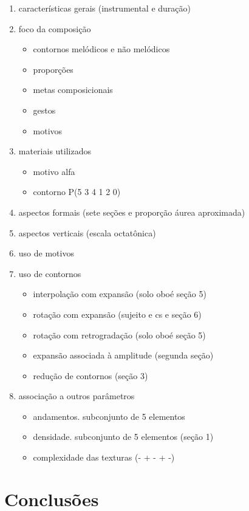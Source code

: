 \documentclass[12pt,a4paper]{article}
\begin{document}
\begin{enumerate}
\item características gerais (instrumental e duração)
\item foco da composição
  \begin{itemize}
  \item contornos melódicos e não melódicos
  \item proporções
  \item metas composicionais
  \item gestos
  \item motivos
  \end{itemize}
\item materiais utilizados
  \begin{itemize}
  \item motivo alfa
  \item contorno P(5 3 4 1 2 0)
  \end{itemize}
\item aspectos formais (sete seções e proporção áurea aproximada)
\item aspectos verticais (escala octatônica)
\item uso de motivos
\item uso de contornos
  \begin{itemize}
  \item interpolação com expansão (solo oboé seção 5)
  \item rotação com expansão (sujeito e cs e seção 6)
  \item rotação com retrogradação (solo oboé seção 5)
  \item expansão associada à amplitude (segunda seção)
  \item redução de contornos (seção 3)
  \end{itemize}
\item associação a outros parâmetros
  \begin{itemize}
  \item andamentos. subconjunto de 5 elementos
  \item densidade. subconjunto de 5 elementos (seção 1)
  \item complexidade das texturas (- + - + -)
  \end{itemize}
\end{enumerate}

\section{Conclusões}
\end{document}
